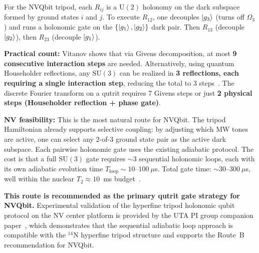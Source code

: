 \documentclass[11pt,letterpaper]{article}
\newcommand{\SU}{\mathrm{SU}}
\newcommand{\UU}{\mathrm{U}}
\begin{document}
For the NVQbit tripod, each $R_{ij}$ is a $\UU(2)$ holonomy on the dark subspace formed by
ground states $i$ and $j$. To execute $R_{12}$, one decouples $\ket{g_3}$ (turns off
$\Omega_3$) and runs a holonomic gate on the $\{\ket{g_1}, \ket{g_2}\}$ dark pair. Then
$R_{13}$ (decouple $\ket{g_2}$), then $R_{23}$ (decouple $\ket{g_1}$).

\textbf{Practical count:} Vitanov shows that via Givens decomposition, at most
\textbf{9 consecutive interaction steps} are needed. %
Alternatively, using quantum
Householder reflections, any $\SU(3)$ can be realized in \textbf{3 reflections, each
requiring a single interaction step}, reducing the total to 3 steps~\cite{Vitanov2012}. %
The discrete Fourier transform on a qutrit requires 7 Givens steps or just \textbf{2 physical steps (Householder reflection + phase gate)}. %

\textbf{NV feasibility:} This is the most natural route for NVQbit. The tripod
Hamiltonian already supports selective coupling: by adjusting which MW tones are active,
one can select any 2-of-3 ground state pair as the active dark subspace. Each pairwise
holonomic gate uses the existing adiabatic protocol. The cost is that a full $\SU(3)$
gate requires $\sim$3 sequential holonomic loops, each with its own adiabatic
evolution time $T_{\text{loop}} \sim 10$--$100~\mu$s. Total gate time: $\sim
30$--$300~\mu$s, well within the nuclear $T_2 \approx 10$~ms %
budget~\cite{Pfender2017}.

\textbf{This route is recommended as the primary qutrit gate strategy for NVQbit.}
Experimental validation of the hyperfine tripod holonomic qubit protocol on the NV center platform
is provided by the UTA PI group companion paper~\cite{Biswas2026}, which demonstrates that the
sequential adiabatic loop approach is compatible with the $^{14}$N hyperfine tripod structure and
supports the Route~B recommendation for NVQbit. %
\end{document}
